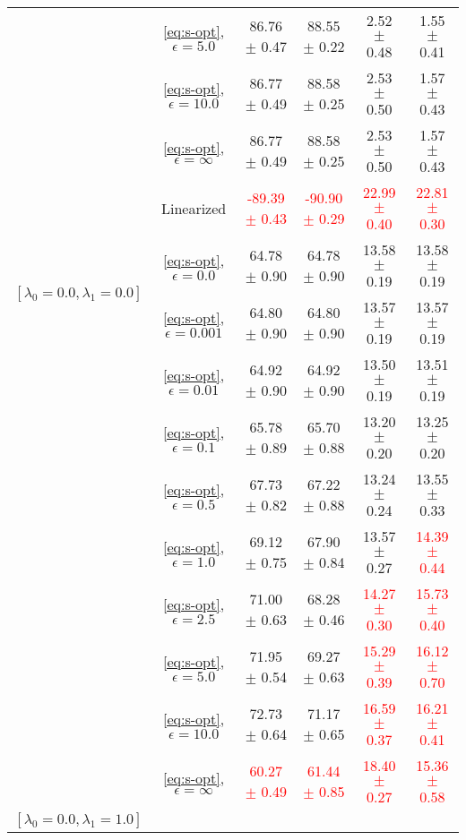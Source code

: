 \begin{table}[h]
\begin{adjustbox}{max width=1\textwidth,center}
\begin{tabular}{cccccc}
& \ref{eq:s-opt}, $\epsilon=5.0$  & 86.76 $\pm$ 0.47 & 88.55 $\pm$ 0.22   & 2.52 $\pm$ 0.48 & 1.55 $\pm$ 0.41\\
& \ref{eq:s-opt}, $\epsilon=10.0$  & 86.77 $\pm$ 0.49 & 88.58 $\pm$ 0.25   & 2.53 $\pm$ 0.50 & 1.57 $\pm$ 0.43  \\
& \ref{eq:s-opt}, $\epsilon=\infty$  & 86.77 $\pm$ 0.49 & 88.58 $\pm$ 0.25   & 2.53 $\pm$ 0.50 & 1.57 $\pm$ 0.43  \\
    \midrule
    \multirow{4}{*}{$[\lambda_0=0.0, \lambda_1 = 0.0]$}
    & Linearized & \textcolor{red}{-89.39 $\pm$ 0.43} & \textcolor{red}{-90.90 $\pm$ 0.29 }  & \textcolor{red}{22.99 $\pm$ 0.40 }& \textcolor{red}{22.81 $\pm$ 0.30 }  \\ 
    & \ref{eq:s-opt}, $\epsilon=0.0$  & 64.78 $\pm$ 0.90 & 64.78 $\pm$ 0.90   & 13.58 $\pm$ 0.19 & 13.58 $\pm$ 0.19\\
& \ref{eq:s-opt}, $\epsilon=0.001$  & 64.80 $\pm$ 0.90 & 64.80 $\pm$ 0.90   & 13.57 $\pm$ 0.19 & 13.57 $\pm$ 0.19\\
& \ref{eq:s-opt}, $\epsilon=0.01$  & 64.92 $\pm$ 0.90 & 64.92 $\pm$ 0.90   & 13.50 $\pm$ 0.19 & 13.51 $\pm$ 0.19\\
& \ref{eq:s-opt}, $\epsilon=0.1$  & 65.78 $\pm$ 0.89 & 65.70 $\pm$ 0.88   & 13.20 $\pm$ 0.20 & 13.25 $\pm$ 0.20  \\
& \ref{eq:s-opt}, $\epsilon=0.5$  & 67.73 $\pm$ 0.82 & 67.22 $\pm$ 0.88   & 13.24 $\pm$ 0.24 & 13.55 $\pm$ 0.33\\
& \ref{eq:s-opt}, $\epsilon=1.0$  & 69.12 $\pm$ 0.75 & 67.90 $\pm$ 0.84   & 13.57 $\pm$ 0.27 & \textcolor{red}{14.39 $\pm$ 0.44 }\\
& \ref{eq:s-opt}, $\epsilon=2.5$  & 71.00 $\pm$ 0.63 & 68.28 $\pm$ 0.46   & \textcolor{red}{14.27 $\pm$ 0.30 }& \textcolor{red}{15.73 $\pm$ 0.40 }  \\
& \ref{eq:s-opt}, $\epsilon=5.0$  & 71.95 $\pm$ 0.54 & 69.27 $\pm$ 0.63   & \textcolor{red}{15.29 $\pm$ 0.39 }& \textcolor{red}{16.12 $\pm$ 0.70 }  \\
& \ref{eq:s-opt}, $\epsilon=10.0$  & 72.73 $\pm$ 0.64 & 71.17 $\pm$ 0.65   & \textcolor{red}{16.59 $\pm$ 0.37 }& \textcolor{red}{16.21 $\pm$ 0.41 }\\
& \ref{eq:s-opt}, $\epsilon=\infty$  & \textcolor{red}{60.27 $\pm$ 0.49} & \textcolor{red}{61.44 $\pm$ 0.85 }  & \textcolor{red}{18.40 $\pm$ 0.27 }& \textcolor{red}{15.36 $\pm$ 0.58 }  \\
    \midrule
    \multirow{4}{*}{$[\lambda_0=0.0, \lambda_1 = 1.0]$}

\end{tabular}
\end{adjustbox}
\end{table}

